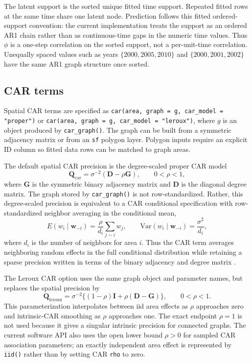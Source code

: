 \documentclass[11pt]{article}
\newcommand{\bw}{\bm{w}}
\newcommand{\bD}{\bm{D}}
\newcommand{\bG}{\bm{G}}
\newcommand{\bI}{\bm{I}}
\newcommand{\bQ}{\bm{Q}}
\begin{document}
The latent support is the sorted unique fitted time support. Repeated fitted rows at the same time share one latent node. Prediction follows this fitted ordered-support convention: the current implementation treats the support as an ordered AR1 chain rather than as continuous-time gaps in the numeric time values. Thus $\phi$ is a one-step correlation on the sorted support, not a per-unit-time correlation. Unequally spaced values such as years $\{2000,2005,2010\}$ and $\{2000,2001,2002\}$ have the same AR1 graph structure once sorted.

\subsection{CAR terms}

Spatial CAR terms are specified as \texttt{car(area, graph = g, car\_model = "proper")} or \texttt{car(area, graph = g, car\_model = "leroux")}, where $g$ is an object produced by \texttt{car\_graph()}. The graph can be built from a symmetric adjacency matrix or from an \texttt{sf} polygon layer. Polygon inputs require an explicit ID column so fitted data rows can be matched to graph areas.

The default spatial CAR precision is the degree-scaled proper CAR model
\begin{equation}
  \bQ_{\mathrm{car}}
    = \sigma^{-2}(\bD - \rho \bG),
    \qquad 0 < \rho < 1,
\end{equation}
where $\bG$ is the symmetric binary adjacency matrix and $\bD$ is the diagonal degree matrix. The graph stored by \texttt{car\_graph()} is not row-standardized. Rather, this degree-scaled precision is equivalent to a CAR conditional specification with row-standardized neighbor averaging in the conditional mean,
\begin{equation}
  E(w_i\mid\bw_{-i})
    = \frac{\rho}{d_i}\sum_{j\sim i} w_j,
  \qquad
  \mathrm{Var}(w_i\mid\bw_{-i})
    = \frac{\sigma^2}{d_i},
\end{equation}
where $d_i$ is the number of neighbors for area $i$. Thus the CAR term averages neighboring random effects in the full conditional distribution while retaining a sparse precision written in terms of the binary adjacency and degree matrix \cite{banerjee2014hierarchical}.

The Leroux CAR option \citep{LerouxLeiBreslow1999} uses the same graph object and parameter names, but replaces the spatial precision by
\begin{equation}
  \bQ_{\mathrm{leroux}}
    = \sigma^{-2}\{(1-\rho)\bI + \rho(\bD-\bG)\},
    \qquad 0 < \rho < 1.
\end{equation}
This parameterization interpolates between iid area effects as $\rho$ approaches zero and intrinsic-CAR smoothing as $\rho$ approaches one. The exact endpoint $\rho=1$ is not used because it gives a singular intrinsic precision for connected graphs. The current software API also uses the open lower bound $\rho>0$ for sampled CAR association parameters; an exactly independent area effect is represented by \texttt{iid()} rather than by setting CAR \texttt{rho} to zero.
\end{document}
